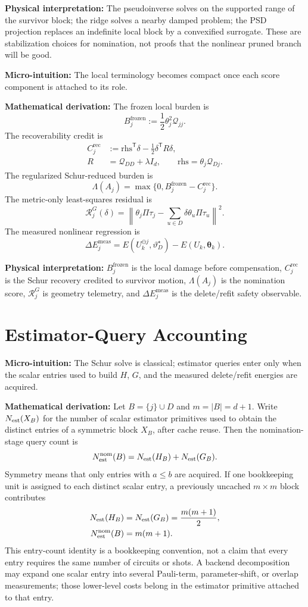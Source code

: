 \documentclass[10pt,twocolumn]{article}
\newcommand{\rhs}{\mathrm{rhs}}
\newcommand{\blocktitle}[1]{\vspace{2pt}\noindent\textbf{#1}\space}
\newcommand{\micro}[1]{\blocktitle{Micro-intuition:} #1}
\newcommand{\deriv}{\blocktitle{Mathematical derivation:}}
\newcommand{\phys}[1]{\blocktitle{Physical interpretation:} #1}
\begin{document}
\phys{The pseudoinverse solves on the supported range of the survivor block; the ridge solves a nearby damped problem; the PSD projection replaces an indefinite local block by a convexified surrogate. These are stabilization choices for nomination, not proofs that the nonlinear pruned branch will be good.}

\micro{The local terminology becomes compact once each score component is attached to its role.}

\deriv
The frozen local burden is
\[
B_j^{\mathrm{frozen}}
:=
\frac12\theta_j^2\mathcal Q_{jj}.
\]
The recoverability credit is
\[
\begin{aligned}
C_j^{\mathrm{rec}}
&:=
\rhs^{\mathsf T}\delta
-
\frac12\delta^{\mathsf T}R\delta,
\\
R&=\mathcal Q_{DD}+\lambda I_d,
\qquad
\rhs=\theta_j\mathcal Q_{Dj}.
\end{aligned}
\]
The regularized Schur-reduced burden is
\[
\Lambda(A_j)
=
\max\{0,B_j^{\mathrm{frozen}}-C_j^{\mathrm{rec}}\}.
\]
The metric-only least-squares residual is
\[
\mathcal R_j^G(\delta)
=
\left\|
\theta_j\Pi\tau_j-\sum_{u\in D}\delta\theta_u\Pi\tau_u
\right\|^2.
\]
The measured nonlinear regression is
\[
\Delta E_j^{\mathrm{meas}}
=
E(U_k^{\ominus j},\vartheta_D^\star)
-
E(U_k,\boldsymbol\theta_k).
\]

\phys{\(B_j^{\mathrm{frozen}}\) is the local damage before compensation, \(C_j^{\mathrm{rec}}\) is the Schur recovery credited to survivor motion, \(\Lambda(A_j)\) is the nomination score, \(\mathcal R_j^G\) is geometry telemetry, and \(\Delta E_j^{\mathrm{meas}}\) is the delete/refit safety observable.}

\section*{Estimator-Query Accounting}

\micro{The Schur solve is classical; estimator queries enter only when the scalar entries used to build \(H\), \(G\), and the measured delete/refit energies are acquired.}

\deriv
Let \(B=\{j\}\cup D\) and \(m=|B|=d+1\). Write \(N_{\rm est}(X_B)\) for the number of scalar estimator primitives used to obtain the distinct entries of a symmetric block \(X_B\), after cache reuse. Then the nomination-stage query count is
\[
N_{\rm est}^{\rm nom}(B)
=
N_{\rm est}(H_B)+N_{\rm est}(G_B).
\]
Symmetry means that only entries with \(a\le b\) are acquired. If one bookkeeping unit is assigned to each distinct scalar entry, a previously uncached \(m\times m\) block contributes
\[
\begin{aligned}
N_{\rm est}(H_B)
&=N_{\rm est}(G_B)=\frac{m(m+1)}{2},
\\
N_{\rm est}^{\rm nom}(B)
&=m(m+1).
\end{aligned}
\]
This entry-count identity is a bookkeeping convention, not a claim that every entry requires the same number of circuits or shots. A backend decomposition may expand one scalar entry into several Pauli-term, parameter-shift, or overlap measurements; those lower-level costs belong in the estimator primitive attached to that entry.
\end{document}
